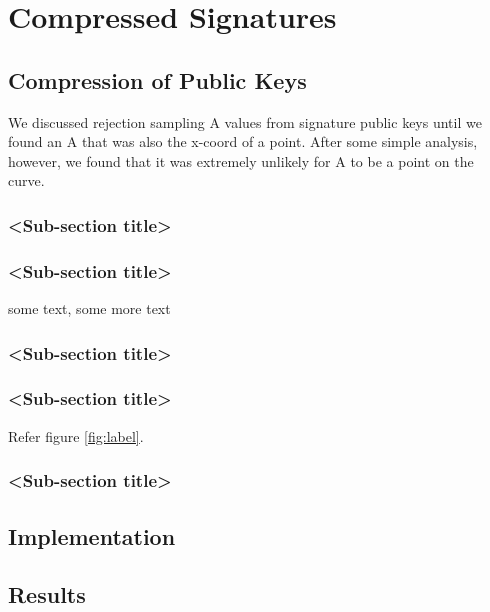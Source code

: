 \chapter{Compressed Signatures}

\section{Compression of Public Keys}

We discussed rejection sampling A values from signature public keys until we found an A that was also the x-coord of a point. After some simple analysis, however, we found that it was extremely unlikely for A to be a point on the curve.\\

\subsection{<Sub-section title>}

\subsection{<Sub-section title>}
some text\cite{citation-2-name-here}, some more text
\subsection{<Sub-section title>}

\subsection{<Sub-section title>}

Refer figure \ref{fig:label}.

\subsection{<Sub-section title>}


\section{Implementation}

\section{Results}

